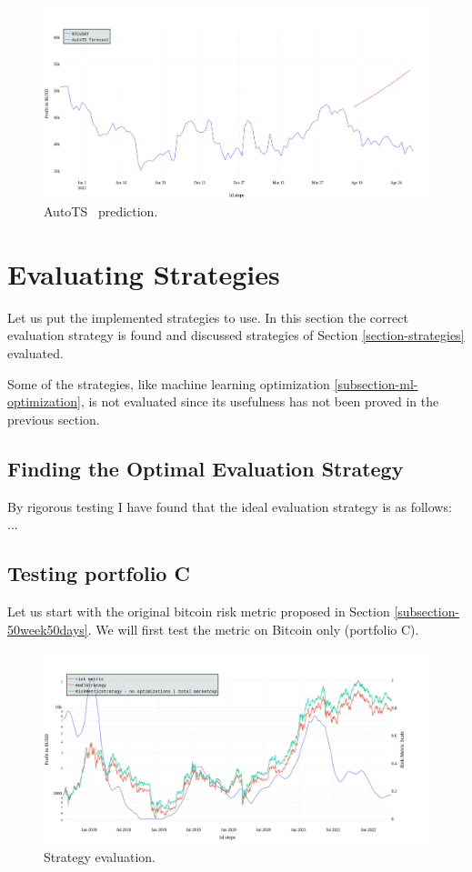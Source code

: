 \begin{figure}[!hbt]
    \centering
    \includegraphics[width=\columnwidth]{figures/autots-prediction.png}
    \caption{AutoTS~\cite{autots} prediction.}
    \label{figure-autots-prediction}
\end{figure}

\section{Evaluating Strategies}
Let us put the implemented strategies to use. In this section the correct evaluation strategy is found and discussed strategies of Section \ref{section-strategies} evaluated.

Some of the strategies, like machine learning optimization \ref{subsection-ml-optimization}, is not evaluated since its usefulness has not been proved in the previous section.

\subsection*{Finding the Optimal Evaluation Strategy}
By rigorous testing I have found that the ideal evaluation strategy is as follows: ...


\subsection{Testing portfolio C}
Let us start with the original bitcoin risk metric proposed in Section \ref{subsection-50week50days}. We will first test the metric on Bitcoin only (portfolio C).

\begin{figure}[!hbt]
    \centering
    \includegraphics[width=\columnwidth]{figures/strat-eval1.png}
    \caption{Strategy evaluation.}
    \label{figure-strat-eval}
\end{figure}

